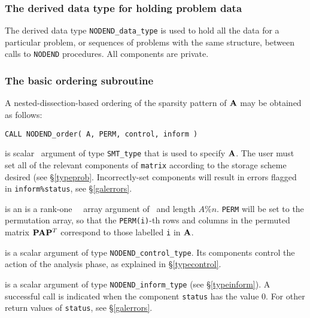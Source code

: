 \documentclass{galahad}
\newcommand{\packagename}{NODEND}
\begin{document}

\subsubsection{The derived data type for holding problem data}\label{typedata}
The derived data type
{\tt \packagename\_data\_type}
is used to hold all the data for a particular problem,
or sequences of problems with the same structure, between calls to
{\tt \packagename} procedures.
All components are private.


\galarguments


\subsubsection{The basic ordering subroutine}\label{suborder}
A nested-dissection-based ordering of the sparsity pattern of ${\mathbf{A}}$ 
may be obtained as follows:
\vskip2mm

\hskip0.5in
{\tt CALL \packagename\_order( A, PERM, control, inform )}
\begin{description}
 is scalar \intentin\ argument of type {\tt SMT\_type}
that is used to specify ${\mathbf{A}}$.
The user must set all of the relevant components of {\tt matrix} according
to the storage scheme desired (see \S\ref{typeprob}.
Incorrectly-set components will result in errors
flagged in {\tt inform\%status}, see \S\ref{galerrors}.

 is an 
 is a rank-one \integer\ \intentout\ array argument
of \intentout\ and length $A\%n$.
{\tt PERM} will be set to the permutation array, so that the 
{\tt PERM(i)}-th rows and columns in the permuted matrix 
${\mathbf{P}} {\mathbf{A}} {\mathbf{P}}^T$ correspond to those labelled {\tt i} in ${\mathbf{A}}$.

 is a scalar \intentout argument of type
{\tt \packagename\_control\_type}. Its components control the action
of the analysis phase, as explained in
\S\ref{typecontrol}.

 is a scalar \intentout argument of type
{\tt \packagename\_inform\_type}
(see \S\ref{typeinform}).
A successful call is indicated when the  component {\tt status} has the value 0.
For other return values of {\tt status}, see \S\ref{galerrors}.

\end{description}
\end{document}
